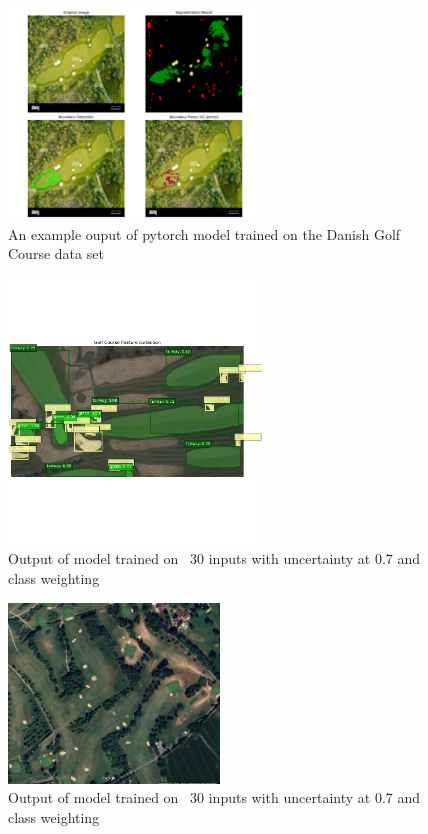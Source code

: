 \documentclass[final]{cmpreport_02}
\begin{document}
\begin{figure}[h!]
	\centering
	\includegraphics[width=0.6\textwidth]{./images/overheadGolfCourse_visualisation.png}
	\caption{An example ouput of pytorch model trained on the Danish Golf Course data set}
	\label{am:ohGCDanish}
\end{figure}

\begin{figure}[h!]
	\centering
	\includegraphics[width=0.6\textwidth]{./images/AENoRoughDemoTraining.png}
	\caption{Output of model trained on ~30 inputs with uncertainty at 0.7 and class weighting}
	\label{am:AENoRoughDemoTraining}
\end{figure}


\begin{figure}[h!]
	\centering
	\includegraphics[width=0.5\textwidth]{./images/AEEnglishCoursePlain.png}
	\caption{Output of model trained on ~30 inputs with uncertainty at 0.7 and class weighting}
	\label{am:AEEnglishCoursePlain}
\end{figure}
\end{document}
